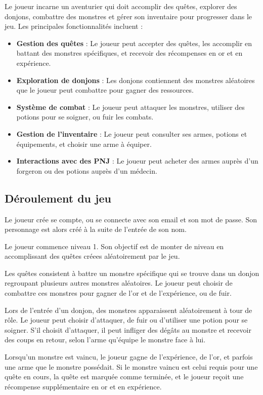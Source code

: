 \documentclass{article}
\begin{document}
Le joueur incarne un aventurier qui doit accomplir des quêtes, explorer des donjons, combattre des monstres et gérer son inventaire pour progresser dans le jeu. Les principales fonctionnalités incluent :
\begin{itemize}
    \item \textbf{Gestion des quêtes} : Le joueur peut accepter des quêtes, les accomplir en battant des monstres spécifiques, et recevoir des récompenses en or et en expérience.
    \item \textbf{Exploration de donjons} : Les donjons contiennent des monstres aléatoires que le joueur peut combattre pour gagner des ressources.
    \item \textbf{Système de combat} : Le joueur peut attaquer les monstres, utiliser des potions pour se soigner, ou fuir les combats.
    \item \textbf{Gestion de l'inventaire} : Le joueur peut consulter ses armes, potions et équipements, et choisir une arme à équiper.
    \item \textbf{Interactions avec des PNJ} : Le joueur peut acheter des armes auprès d'un forgeron ou des potions auprès d'un médecin.
\end{itemize}

\subsection{Déroulement du jeu}
Le joueur crée se compte, ou se connecte avec son email et son mot de passe. Son personnage est alors créé à la suite de l'entrée de son nom.

Le joueur commence niveau 1. Son objectif est de monter de niveau en accomplissant des quêtes créees aléatoirement par le jeu.

Les quêtes consistent à battre un monstre spécifique qui se trouve dans un donjon regroupant plusieurs autres monstres aléatoires. Le joueur peut choisir de combattre ces monstres pour gagner de l'or et de l'expérience, ou de fuir.

Lors de l'entrée d'un donjon, des monstres apparaissent aléatoirement à tour de rôle. Le joueur peut choisir d'attaquer, de fuir ou d'utiliser une potion pour se soigner. S'il choisit d'attaquer, il peut infliger des dégâts au monstre et recevoir des coups en retour, selon l'arme qu'équipe le monstre face à lui.

Lorsqu'un monstre est vaincu, le joueur gagne de l'expérience, de l'or, et parfois une arme que le monstre possédait. Si le monstre vaincu est celui requis pour une quête en cours, la quête est marquée comme terminée, et le joueur reçoit une récompense supplémentaire en or et en expérience.
\end{document}
